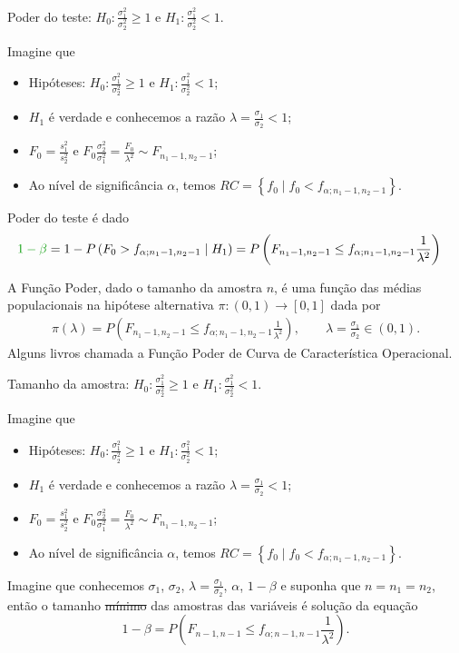 \documentclass[9pt]{beamer}
\begin{document}
\begin{frame}{Poder do teste: $H_0:\frac{\sigma_1^2}{\sigma_2^2} \geq 1$ e $H_1:\frac{\sigma_1^2}{\sigma_2^2} < 1$.}

\normalsize

Imagine que
\begin{itemize}
	\item Hipóteses: $H_0:\frac{\sigma_1^2}{\sigma_2^2} \geq 1$ e $H_1:\frac{\sigma_1^2}{\sigma_2^2} < 1$;
	\item $H_1$ é verdade e conhecemos a razão $\lambda=\frac{\sigma_1}{\sigma_2} < 1$;
	\item $F_0 = \frac{s_1^2}{s_2^2}$ e $F_0 \frac{\sigma_2^2}{\sigma_1^2} = \frac{F_0}{\lambda^2} \sim F_{n_1-1, n_2-1}$;
	\item Ao nível de significância $\alpha$, temos $RC = \left\{ f_0 \mid f_0 < f_{\alpha; n_1-1, n_2-1} \right\}$.
\end{itemize}
\vfill	

Poder do teste é dado
\begin{align*}
\textcolor{important}{1-\beta} &=1 - P\left( F_0 > f_{\alpha; n_1-1, n_2-1} \mid H_1\right)=  P \left(F_{n_1-1, n_2-1} \leq f_{\alpha; n_1-1, n_2-1} \frac{1}{\lambda^2} \right)
\end{align*}
\vfill

A \textcolor{important}{Função Poder}, dado o tamanho da amostra $n$, é uma função das médias populacionais na hipótese alternativa  $\pi: (0,1) \longrightarrow [0,1]$ dada por
\begin{align*}
\pi(\lambda) = P \left(F_{n_1-1, n_2-1} \leq f_{\alpha; n_1-1, n_2-1} \frac{1}{\lambda^2} \right), \qquad \lambda = \frac{\sigma_1}{\sigma_2} \in (0, 1).
\end{align*}
Alguns livros chamada a Função Poder de \textcolor{important}{Curva de Característica Operacional.}

\normalsize
\end{frame}

\begin{frame}{Tamanho da amostra: $H_0:\frac{\sigma_1^2}{\sigma_2^2} \geq 1$ e $H_1:\frac{\sigma_1^2}{\sigma_2^2} < 1$.}

Imagine que
\begin{itemize}
\item Hipóteses: $H_0:\frac{\sigma_1^2}{\sigma_2^2} \geq 1$ e $H_1:\frac{\sigma_1^2}{\sigma_2^2} < 1$;
\item $H_1$ é verdade e conhecemos a razão $\lambda=\frac{\sigma_1}{\sigma_2} < 1$;
\item $F_0 = \frac{s_1^2}{s_2^2}$ e $F_0 \frac{\sigma_2^2}{\sigma_1^2} = \frac{F_0}{\lambda^2} \sim F_{n_1-1, n_2-1}$;
\item Ao nível de significância $\alpha$, temos $RC = \left\{ f_0 \mid f_0 < f_{\alpha; n_1-1, n_2-1}  \right\}$.
\end{itemize}
\vfill


Imagine que conhecemos $\sigma_1$, $\sigma_2$, $\lambda = \frac{\sigma_1}{\sigma_2}$, $\alpha$, $1-\beta$ e suponha que $n=n_1=n_2$, então o tamanho \sout{mínimo} das amostras das variáveis é solução da equação
$$1-\beta=P \left(F_{n-1, n-1} \leq f_{\alpha; n-1, n-1} \frac{1}{\lambda^2} \right).$$
\end{frame}
\end{document}
